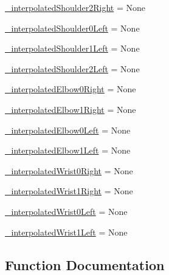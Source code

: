 \begin{DoxyCompactItemize}
\item 
\mbox{\hyperlink{namespaceinterpolate__steering_a310a5e4a202f4e6c0edc8e4906d8d60f}{\+\_\+interpolated\+Shoulder2\+Right}} = None
\item 
\mbox{\hyperlink{namespaceinterpolate__steering_adae131aa93463c1fec127801d935361f}{\+\_\+interpolated\+Shoulder0\+Left}} = None
\item 
\mbox{\hyperlink{namespaceinterpolate__steering_a52879b7044489728f5e4312a3a22c8eb}{\+\_\+interpolated\+Shoulder1\+Left}} = None
\item 
\mbox{\hyperlink{namespaceinterpolate__steering_af0fda5a4da847b7cc30b88e6226e0a59}{\+\_\+interpolated\+Shoulder2\+Left}} = None
\item 
\mbox{\hyperlink{namespaceinterpolate__steering_aa597e1f1a7678b14037ad84fde83470a}{\+\_\+interpolated\+Elbow0\+Right}} = None
\item 
\mbox{\hyperlink{namespaceinterpolate__steering_a1c7b0659acefe3308760033e4c4e8530}{\+\_\+interpolated\+Elbow1\+Right}} = None
\item 
\mbox{\hyperlink{namespaceinterpolate__steering_a0f18dc9fa3cb4c09e7bf65648493a581}{\+\_\+interpolated\+Elbow0\+Left}} = None
\item 
\mbox{\hyperlink{namespaceinterpolate__steering_a9ca82e8dea08262bbdaefebee317d166}{\+\_\+interpolated\+Elbow1\+Left}} = None
\item 
\mbox{\hyperlink{namespaceinterpolate__steering_a269148bde3a24306c6d2c9e057a083da}{\+\_\+interpolated\+Wrist0\+Right}} = None
\item 
\mbox{\hyperlink{namespaceinterpolate__steering_a1120d89a36664603e7c8ae32e06b1fba}{\+\_\+interpolated\+Wrist1\+Right}} = None
\item 
\mbox{\hyperlink{namespaceinterpolate__steering_a534f9ef49e806735cfa9d53ebb60fb30}{\+\_\+interpolated\+Wrist0\+Left}} = None
\item 
\mbox{\hyperlink{namespaceinterpolate__steering_a2ebe0fa95e633d77946399df5c27eb06}{\+\_\+interpolated\+Wrist1\+Left}} = None
\end{DoxyCompactItemize}


\subsection{Function Documentation}
\mbox{\label{namespaceinterpolate__steering_a879e5de92db913e5d97859cab0e79ec3}} 
